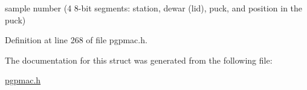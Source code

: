 sample number (4 8-\/bit segments\-: station, dewar (lid), puck, and position in the puck) 



Definition at line 268 of file pgpmac.\-h.



The documentation for this struct was generated from the following file\-:\begin{DoxyCompactItemize}
\item 
\hyperlink{pgpmac_8h}{pgpmac.\-h}\end{DoxyCompactItemize}
